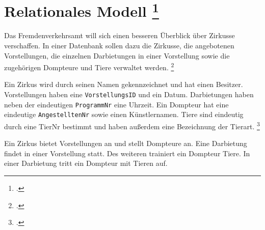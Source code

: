 \documentclass{lehramt-informatik-aufgabe}
\begin{document}

\section{Relationales Modell
\footcite[Thema 2 Aufgabe 2 Seite 11]{examen:66116:2018:03}
}

Das Fremdenverkehrsamt will sich einen besseren Überblick über Zirkusse
verschaffen. In einer Datenbank sollen dazu die Zirkusse, die
angebotenen Vorstellungen, die einzelnen Darbietungen in einer
Vorstellung sowie die zugehörigen Dompteure und Tiere verwaltet werden.
\footcite[Seite 1-2, Aufgabe 1: ER-Diagramm Einstieg]{db:pu:1}

Ein Zirkus wird durch seinen Namen gekennzeichnet und hat einen
Besitzer. Vorstellungen haben eine \texttt{VorstellungsID} und ein
Datum. Darbietungen haben neben der eindeutigen \texttt{ProgrammNr} eine
Uhrzeit. Ein Dompteur hat eine eindeutige \texttt{AngestelltenNr} sowie
einen Künstlernamen. Tiere sind eindeutig durch eine TierNr bestimmt und
haben außerdem eine Bezeichnung der Tierart.
\footcite[Aufgabe 2, I. Das Entity-Relationship Modell, Seite 6]{examen:66114:2008:03}

Ein Zirkus bietet Vorstellungen an und stellt Dompteure an. Eine
Darbietung findet in einer Vorstellung statt. Des weiteren trainiert ein
Dompteur Tiere. In einer Darbietung tritt ein Dompteur mit Tieren auf.
\end{document}
